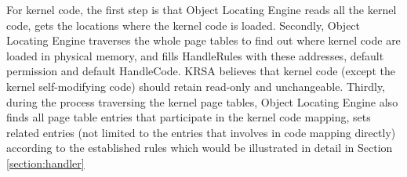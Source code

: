 \documentclass[conference]{IEEEtran}
\begin{document}

For kernel code, the first step is that Object Locating Engine reads all the kernel code, gets the locations where the kernel code is loaded. Secondly, Object Locating Engine traverses the whole page tables to find out where kernel code are loaded in physical memory, and fills HandleRules with these addresses, default permission and default HandleCode. KRSA believes that kernel code (except the kernel self-modifying code) should retain read-only and unchangeable. Thirdly, during the process traversing the kernel page tables, Object Locating Engine also finds all page table entries that participate in the kernel code mapping, sets related entries (not limited to the entries that involves in code mapping directly) according to the established rules which would be illustrated in detail in Section \ref{section:handler} 
\end{document}
